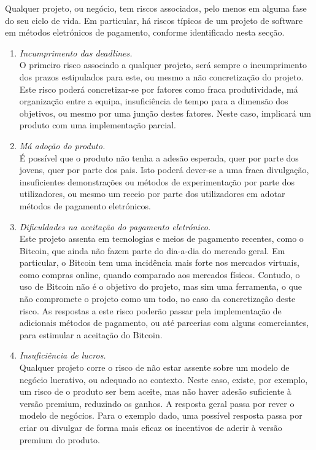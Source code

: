 \documentclass{article}
\begin{document}
    Qualquer projeto, ou negócio, tem riscos associados, pelo menos em alguma fase do seu ciclo de vida. Em particular, há riscos típicos de um projeto de software em métodos eletrónicos de pagamento, conforme identificado nesta secção.

    \begin{enumerate}
      \item \emph{Incumprimento das deadlines.}\\
O primeiro risco associado a qualquer projeto, será sempre o incumprimento dos prazos estipulados para este, ou mesmo a não concretização do projeto. Este risco poderá concretizar-se por fatores como fraca produtividade, má organização entre a equipa, insuficiência de tempo para a dimensão dos objetivos, ou mesmo por uma junção destes fatores. Neste caso, implicará um produto com uma implementação parcial.
      \item \emph{Má adoção do produto.}\\
É possível que o produto não tenha a adesão esperada, quer por parte dos jovens, quer por parte dos pais. Isto poderá dever-se a uma fraca divulgação, insuficientes demonstrações ou métodos de experimentação por parte dos utilizadores, ou mesmo um receio por parte dos utilizadores em adotar métodos de pagamento eletrónicos.
      \item \emph{Dificuldades na aceitação do pagamento eletrónico.}\\
Este projeto assenta em tecnologias e meios de pagamento recentes, como o Bitcoin, que ainda não fazem parte do dia-a-dia do mercado geral. Em particular, o Bitcoin tem uma incidência mais forte nos mercados virtuais, como compras online, quando comparado aos mercados físicos. Contudo, o uso de Bitcoin não é o objetivo do projeto, mas sim uma ferramenta, o que não compromete o projeto como um todo, no caso da concretização deste risco. As respostas a este risco poderão passar pela implementação de adicionais métodos de pagamento, ou até parcerias com alguns comerciantes, para estimular a aceitação do Bitcoin.
      \item \emph{Insuficiência de lucros.}\\
      Qualquer projeto corre o risco de não estar assente sobre um modelo de negócio lucrativo, ou adequado ao contexto. Neste caso, existe, por exemplo, um risco de o produto ser bem aceite, mas não haver adesão suficiente à versão premium, reduzindo os ganhos. A resposta geral passa por rever o modelo de negócios. Para o exemplo dado, uma possível resposta passa por criar ou divulgar de forma mais eficaz os incentivos de aderir à versão premium do produto.
    \end{enumerate}
\end{document}
